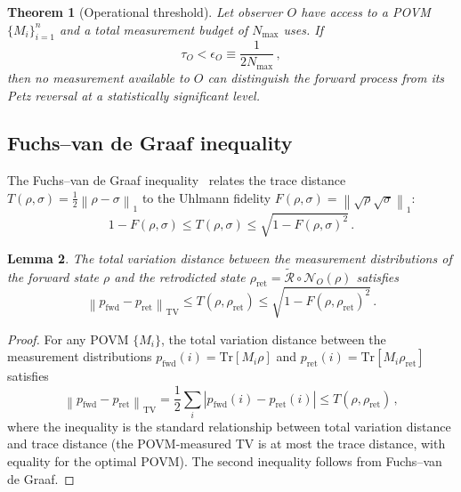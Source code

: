 \documentclass[aps,prd,preprint,superscriptaddress,longbibliography]{revtex4-2}
\newtheorem{theorem}{Theorem}
\newtheorem{lemma}[theorem]{Lemma}
\newcommand{\Tr}{\mathrm{Tr}}
\newcommand{\Petz}{\mathcal{R}}
\newcommand{\chan}{\mathcal{N}}
\newcommand{\norm}[1]{\left\|#1\right\|}
\newcommand{\tauasym}{\tau}
\begin{document}
\begin{theorem}[Operational threshold]
\label{thm:thresh_full}
Let observer $O$ have access to a POVM $\{M_i\}_{i=1}^n$ and a total
measurement budget of $N_{\max}$ uses.  If
\begin{equation}
  \tauasym_O < \epsilon_O \equiv \frac{1}{2N_{\max}}\,,
  \label{eq:threshold_full}
\end{equation}
then no measurement available to $O$ can distinguish the forward
process from its Petz reversal at a statistically significant level.
\end{theorem}

\subsection{Fuchs--van de Graaf inequality}

The Fuchs--van de Graaf inequality~\cite{FuchsGraaf1999} relates the
trace distance $T(\rho,\sigma) = \frac{1}{2}\norm{\rho-\sigma}_1$ to
the Uhlmann fidelity $F(\rho,\sigma) = \norm{\sqrt{\rho}\sqrt{\sigma}}_1$:
\begin{equation}
  1 - F(\rho,\sigma) \leq T(\rho,\sigma) \leq \sqrt{1-F(\rho,\sigma)^2}\,.
  \label{eq:FvdG}
\end{equation}

\begin{lemma}
\label{lem:TV_bound}
The total variation distance between the measurement distributions of
the forward state $\rho$ and the retrodicted state
$\rho_{\mathrm{ret}} = \tilde{\Petz}\circ\chan_O(\rho)$ satisfies
\begin{equation}
  \norm{p_{\mathrm{fwd}} - p_{\mathrm{ret}}}_{\mathrm{TV}}
  \leq T(\rho,\rho_{\mathrm{ret}})
  \leq \sqrt{1 - F(\rho,\rho_{\mathrm{ret}})^2}\,.
  \label{eq:TV_upper}
\end{equation}
\end{lemma}

\begin{proof}
For any POVM $\{M_i\}$, the total variation distance between the
measurement distributions
$p_{\mathrm{fwd}}(i) = \Tr[M_i\rho]$ and
$p_{\mathrm{ret}}(i) = \Tr[M_i\rho_{\mathrm{ret}}]$ satisfies
\begin{equation}
  \norm{p_{\mathrm{fwd}} - p_{\mathrm{ret}}}_{\mathrm{TV}}
  = \frac{1}{2}\sum_i |p_{\mathrm{fwd}}(i) - p_{\mathrm{ret}}(i)|
  \leq T(\rho,\rho_{\mathrm{ret}})\,,
  \label{eq:TV_trace}
\end{equation}
where the inequality is the standard relationship between total
variation distance and trace distance (the POVM-measured TV is at
most the trace distance, with equality for the optimal POVM).
The second inequality follows from Fuchs--van de Graaf.
\end{proof}
\end{document}
